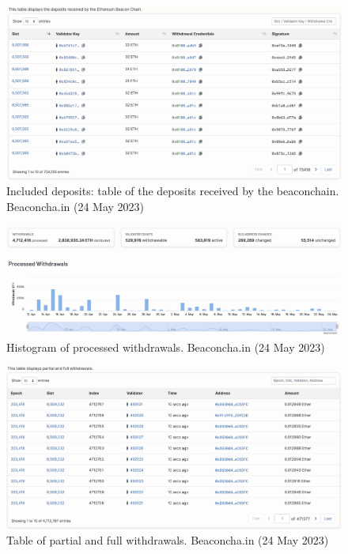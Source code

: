 \documentclass[UTF8]{article}
\begin{document}
\begin{figure}[htbp]
\begin{center}
\includegraphics[width=0.9\linewidth]{images/bincldep}
\caption{Included deposits: table of the deposits received by the beaconchain. Beaconcha.in (24 May 2023)}
\label{fig:bincldep}
\end{center}
\end{figure}

\begin{figure}[htbp]
\begin{center}
\includegraphics[width=0.9\linewidth]{images/bwithdrawals}
\caption{Histogram of processed withdrawals. Beaconcha.in (24 May 2023)}
\label{fig:bwithdrawals}
\end{center}
\end{figure}

\begin{figure}[htbp]
\begin{center}
\includegraphics[width=0.9\linewidth]{images/bwithdrawalstbl}
\caption{Table of partial and full withdrawals. Beaconcha.in (24 May 2023)}
\label{fig:bwithdrawalstbl}
\end{center}
\end{figure}
\end{document}
